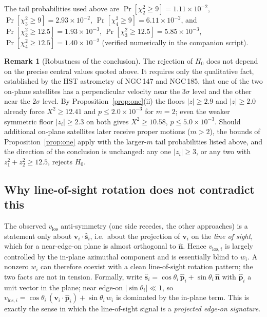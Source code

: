 \documentclass{amsart}
\theoremstyle{definition}
\newtheorem{remark}{Remark}
\begin{document}
The tail probabilities used above are
$\Pr[\chi^2_2\ge9]=1.11\times10^{-2}$,
$\Pr[\chi^2_3\ge9]=2.93\times10^{-2}$,
$\Pr[\chi^2_4\ge9]=6.11\times10^{-2}$, and
$\Pr[\chi^2_2\ge12.5]=1.93\times10^{-3}$,
$\Pr[\chi^2_3\ge12.5]=5.85\times10^{-3}$,
$\Pr[\chi^2_4\ge12.5]=1.40\times10^{-2}$ (verified numerically in the
companion script).

\begin{remark}[Robustness of the conclusion]\label{rem:robust}
The rejection of $H_0$ does not depend on the precise central values quoted
above. It requires only the qualitative fact, established by the HST
astrometry of NGC\,147 and NGC\,185, that one of the two on-plane satellites
has a perpendicular velocity near the $3\sigma$ level and the other near the
$2\sigma$ level. By Proposition~\ref{prop:one}(ii) the floors $|z|\ge 2.9$
and $|z|\ge 2.0$ already force $X^2\ge 12.41$ and $p\le 2.0\times10^{-3}$ for
$m=2$; even the weaker symmetric floor $|z_i|\ge 2.3$ on both gives
$X^2\ge 10.58$, $p\le 5.0\times10^{-3}$. Should additional on-plane
satellites later receive proper motions ($m>2$), the bounds of
Proposition~\ref{prop:one} apply with the larger-$m$ tail probabilities
listed above, and the direction of the conclusion is unchanged: any one
$|z_i|\ge 3$, or any two with $z_1^2+z_2^2\ge 12.5$, rejects $H_0$.
\end{remark}

\subsection{Why line-of-sight rotation does not contradict this}
The observed $v_{\mathrm{los}}$ anti-symmetry (one side recedes, the other
approaches) is a statement only about
$\bm v_i\cdot\hat{\bm s}_i$, i.e.\ about the projection of $\bm v_i$ on the
\emph{line of sight}, which for a near-edge-on plane is almost orthogonal to
$\hat{\bm n}$. Hence $v_{\mathrm{los},i}$ is largely controlled by the
in-plane azimuthal component and is essentially blind to $w_i$. A nonzero
$w_i$ can therefore coexist with a clean line-of-sight rotation pattern; the
two facts are not in tension. Formally, write
$\hat{\bm s}_i=\cos\theta_i\,\hat{\bm p}_i+\sin\theta_i\,\hat{\bm n}$ with
$\hat{\bm p}_i$ a unit vector in the plane; near edge-on $|\sin\theta_i|\ll1$,
so
$v_{\mathrm{los},i}=\cos\theta_i\,(\bm v_i\cdot\hat{\bm p}_i)
+\sin\theta_i\,w_i$ is dominated by the in-plane term. This is exactly the
sense in which the line-of-sight signal is a \emph{projected edge-on
signature}.
\end{document}
